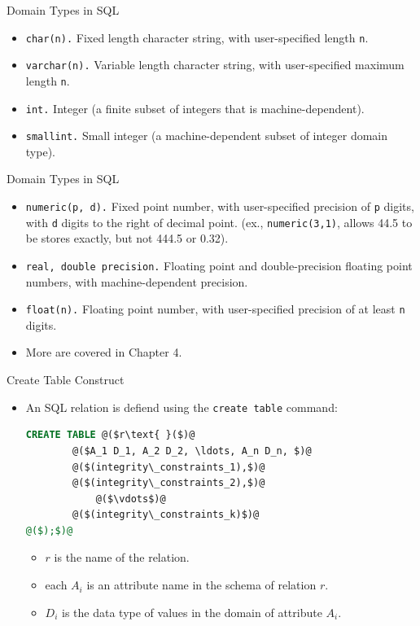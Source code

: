 \documentclass{beamer}
\begin{document}
\begin{frame}{Domain Types in SQL}
    \begin{itemize}
        \item \texttt{char(n).} Fixed length character string, with user-specified length \texttt{n}.
        \item \texttt{varchar(n).} Variable length character string, with user-specified maximum length \texttt{n}.
        \item \texttt{int.} Integer (a finite subset of integers that is machine-dependent).
        \item \texttt{smallint.} Small integer (a machine-dependent subset of integer domain type).
    \end{itemize}
\end{frame}

\begin{frame}{Domain Types in SQL}
    \begin{itemize}
        \item \texttt{numeric(p, d).} Fixed point number, with user-specified precision of \texttt{p} digits, with \texttt{d} digits to the right of decimal point. (ex., \texttt{numeric(3,1)}, allows 44.5 to be stores exactly, but not 444.5 or 0.32).
        \item \texttt{real, double precision.} Floating point and double-precision floating point numbers, with machine-dependent precision.
        \item \texttt{float(n).} Floating point number, with user-specified precision of at least \texttt{n} digits.
        \item More are covered in Chapter 4.
    \end{itemize}
\end{frame}

\begin{frame}[fragile]{Create Table Construct}
    \begin{itemize}
        \item An SQL relation is defiend using the \texttt{create table} command:
        \begin{lstlisting}[language=SQL]
CREATE TABLE @($r\text{ }($)@
        @($A_1 D_1, A_2 D_2, \ldots, A_n D_n, $)@
        @($(integrity\_constraints_1),$)@
        @($(integrity\_constraints_2),$)@
            @($\vdots$)@
        @($(integrity\_constraints_k)$)@
@($);$)@
        \end{lstlisting}
        \begin{itemize}
            \item $r$ is the name of the relation.
            \item each $A_i$ is an attribute name in the schema of relation $r$.
            \item $D_i$ is the data type of values in the domain of attribute $A_i$.
        \end{itemize}
    \end{itemize}
\end{frame}
\end{document}
